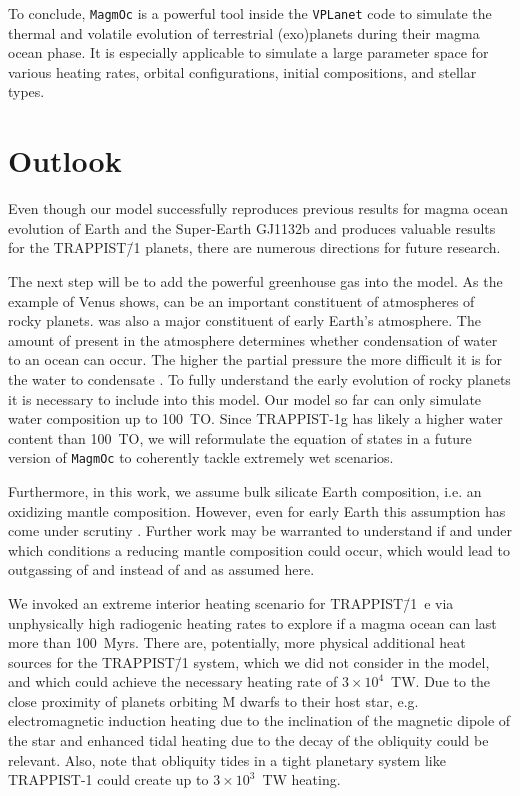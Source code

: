 \documentclass[oneside,twocolumn]{article}
\newcommand{\vplanet}{\texttt{\footnotesize{VPLanet}}}
\newcommand{\magmoc}{\texttt{\footnotesize{MagmOc}}}
\newcommand{\eg}{e.g. }
\begin{document}
To conclude, \magmoc{} is a powerful tool inside the \vplanet{} code to simulate the thermal and volatile evolution of terrestrial (exo)planets during their magma ocean phase.
It is especially applicable to simulate a large parameter space for various heating rates, orbital configurations, initial compositions, and stellar types.

\section{Outlook}
\label{sec: outlook}

Even though our model successfully reproduces previous results for magma ocean evolution of Earth and the Super-Earth GJ1132b \citep{Elkins-Tanton2008,Hamano2013,Schaefer2016} and produces valuable results for the TRAPPIST\=/1 planets, there are numerous directions for future research.

The next step will be to add the powerful greenhouse gas  into the model. As the example of Venus shows,  can be an important constituent of atmospheres of rocky planets. 
 was also a major constituent of early Earth's atmosphere.
The amount of  present in the atmosphere determines whether condensation of water to an ocean can occur. 
The higher the  partial pressure the more difficult it is for the water to condensate \citep{Lebrun2013,Massol2016,Salvador2017,Stueken2020}.
To fully understand the early evolution of rocky planets it is necessary to include  into this model.
Our model so far can only simulate water composition up to 100~TO. Since TRAPPIST-1g has likely a higher water content than 100~TO, we will reformulate the equation of states in a future version of \magmoc{} to coherently tackle extremely wet scenarios.

Furthermore, in this work, we assume bulk silicate Earth composition, i.e. an oxidizing mantle composition. However, even for early Earth this assumption has come under scrutiny \citep{Kasting1993b,Gaillard2014,Ehlmann2016,Fegley2016,Schaefer2016,DelGenio2018,Armstrong2019}. Further work may be warranted to understand if and under which conditions a reducing mantle composition could occur, which would lead to outgassing of  and  instead of  and  as assumed here.

We invoked an extreme interior heating scenario for TRAPPIST\=/1~e via unphysically high radiogenic heating rates to explore if a magma ocean can last more than 100~Myrs.  There are, potentially, more physical additional heat sources for the TRAPPIST\=/1 system, which we did not consider in the model, and which could achieve the necessary heating rate of $3\times 10^4$~TW. Due to the close proximity of planets orbiting M dwarfs to their host star, \eg electromagnetic induction heating due to the inclination of the magnetic dipole of the star \citep{Kislyakova2017} and enhanced tidal heating due to the decay of the obliquity \citep{Heller2011} could be relevant.  Also, \citet{Millholland2019} note that obliquity tides in a tight planetary system like TRAPPIST-1 could create up to $3 \times 10^3$~TW heating.
\end{document}
